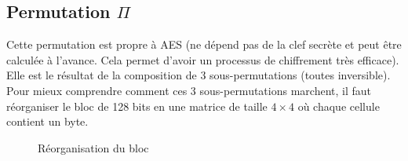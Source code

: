 \documentclass[a4paper, 12pt]{article}
\begin{document}
\subsection{Permutation $\Pi$}
Cette permutation est propre à AES (ne dépend pas de la clef secrète et peut être calculée à l'avance. Cela permet d'avoir un processus de chiffrement très efficace). Elle est le résultat de la composition de 3 sous-permutations (toutes inversible). Pour mieux comprendre comment ces 3 sous-permutations marchent, il faut réorganiser le bloc de 128 bits en une matrice de taille $4\times4$ où chaque cellule contient un byte.

\begin{figure}[h]
\centering
{}
\caption{Réorganisation du bloc}
\label{reorg_entre}
\end{figure}
\end{document}
